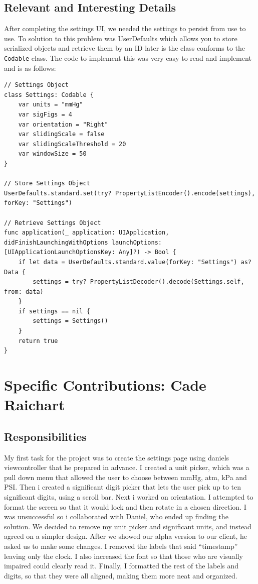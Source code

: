 \documentclass[onecolumn, draftclsnofoot,10pt, compsoc]{IEEEtran}
\begin{document}
    \subsection{Relevant and Interesting Details}
        After completing the settings UI, we needed the settings to persist from use to use.
        To solution to this problem was UserDefaults which allows you to store serialized objects and retrieve them by an ID later is the class conforms to the \texttt{Codable} class.
        The code to implement this was very easy to read and implement and is as follows:

\begin{lstlisting}
// Settings Object
class Settings: Codable {
    var units = "mmHg"
    var sigFigs = 4
    var orientation = "Right"
    var slidingScale = false
    var slidingScaleThreshold = 20
    var windowSize = 50
}

// Store Settings Object
UserDefaults.standard.set(try? PropertyListEncoder().encode(settings), forKey: "Settings")

// Retrieve Settings Object
func application(_ application: UIApplication, didFinishLaunchingWithOptions launchOptions: [UIApplicationLaunchOptionsKey: Any]?) -> Bool {
    if let data = UserDefaults.standard.value(forKey: "Settings") as? Data {
        settings = try? PropertyListDecoder().decode(Settings.self, from: data)
    }
    if settings == nil {
        settings = Settings()
    }
    return true
}

\end{lstlisting}


\section{Specific Contributions: Cade Raichart}
\subsection{Responsibilities}
  My first task for the project was to create the settings page using daniels viewcontroller that he prepared in advance.
  I created  a unit picker, which was a pull down menu that allowed the user to choose between mmHg, atm, kPa and PSI.
  Then i created a significant digit picker that lets the user pick up to ten significant digits, using a scroll bar. 
  Next i worked on orientation. 
  I attempted to format the screen so that it would lock and then rotate in a chosen direction.
  I was  unsuccessful so i collaborated with Daniel, who ended up finding the solution. We decided to remove my unit picker and significant     units, and instead agreed on a simpler design.
  After we showed our alpha version to our client, he asked us to make some changes.
  I removed the labels that said “timestamp” leaving only the clock. 
  I also increased the font so that those who are visually impaired could clearly read it. 
  Finally, I  formatted the rest of the labels and digits, so that they were all aligned, making them more neat and organized.
  
\end{document}
